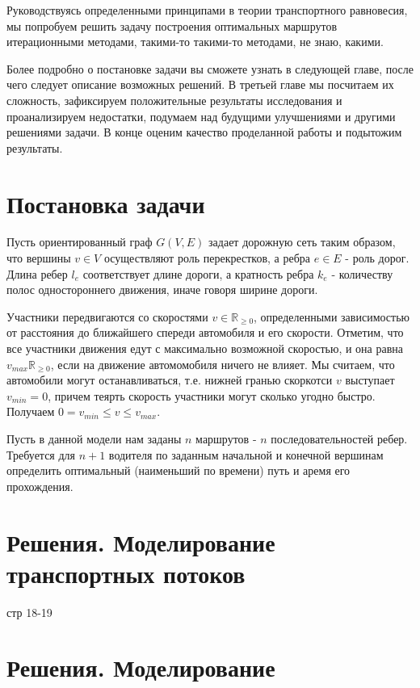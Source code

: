 \documentclass[12pt, a4paper]{article}
\begin{document}
Руководствуясь определенными принципами в теории транспортного равновесия, мы попробуем решить задачу построения оптимальных маршрутов итерационными методами, такими-то такими-то методами, не знаю, какими. 

Более подробно о постановке задачи вы сможете узнать в следующей главе, после чего следует описание возможных решений. В третьей главе мы посчитаем их сложность, зафиксируем положительные результаты исследования и проанализируем недостатки, подумаем над будущими улучшениями и другими решениями задачи. В конце оценим качество проделанной работы и подытожим результаты.

\newpage
\section*{Постановка задачи}

Пусть ориентированный граф $ G (V, E)$ задает дорожную сеть таким образом, что вершины $ v \in V$ осуществляют роль перекрестков, а ребра $e \in E$ - роль дорог. Длина ребер $l_e$ соответствует длине дороги, а кратность ребра $ k_e $ - количеству полос одностороннего движения, иначе говоря ширине дороги. 

Участники передвигаются со скоростями $v \in \mathbb {R}_{\geq 0}$, определенными зависимостью от расстояния до ближайшего спереди автомобиля и его скорости. Отметим, что все участники движения едут с максимально возможной скоростью, и она равна $ v_{max} \mathbb {R}_{\geq 0}$, если на движение автомомобиля ничего не влияет. Мы считаем, что автомобили могут останавливаться, т.е. нижней гранью скоркотси $ v $ выступает $v_{min} = 0$, причем теярть скорость участники могут сколько угодно быстро. Получаем $ 0 = v_{min} \leq v \leq v_{max} $.

Пусть в данной модели нам заданы $ n $ маршрутов - $ n $ последовательностей ребер. Требуется для $ n+1 $ водителя по заданным начальной и конечной вершинам определить оптимальный (наименьший по времени) путь и аремя его прохождения.

\newpage
\section*{Решения. Моделирование транспортных потоков}

стр 18-19


\newpage
\section*{Решения. Моделирование}
\end{document}
